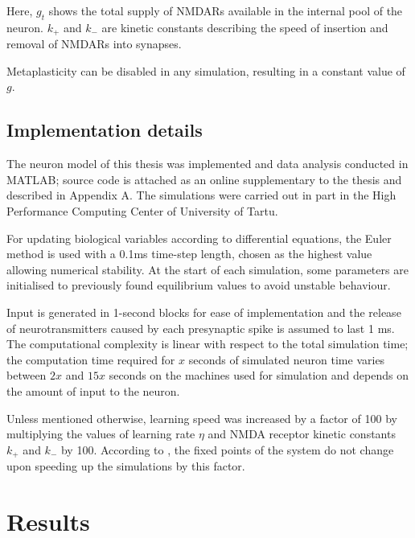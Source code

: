 \documentclass[a4paper,12pt]{report}
\theoremstyle{definition}
\begin{document}
Here, $g_t$ shows the total supply of NMDARs available in the internal pool of the neuron. $k_+$ and $k_-$ are kinetic constants describing the speed of insertion and removal of NMDARs into synapses.

Metaplasticity can be disabled in any simulation, resulting in a constant value of $g$.





\section{Implementation details}

The neuron model of this thesis was implemented and data analysis conducted in MATLAB; source code is attached as an online supplementary to the thesis and described in Appendix A. The simulations were carried out in part in the High Performance Computing Center of University of Tartu.

For updating biological variables according to differential equations, the Euler method is used with a 0.1ms time-step length, chosen as the highest value allowing numerical stability. At the start of each simulation, some parameters are initialised to previously found equilibrium values to avoid unstable behaviour.

Input is generated in 1-second blocks for ease of implementation and the release of neurotransmitters caused by each presynaptic spike is assumed to last 1 ms. The computational complexity is linear with respect to the total simulation time; the computation time required for $x$ seconds of simulated neuron time varies between $2x$ and $15x$ seconds on the machines used for simulation and depends on the amount of input to the neuron.

Unless mentioned otherwise, learning speed was increased by a factor of 100 by multiplying the values of learning rate $\eta$ and NMDA receptor kinetic constants $k_+$ and $k_-$ by 100. According to \cite{yeung2004synaptic}, the fixed points of the system do not change upon speeding up the simulations by this factor.












\chapter{Results}
\label{chapter:results}
\end{document}
